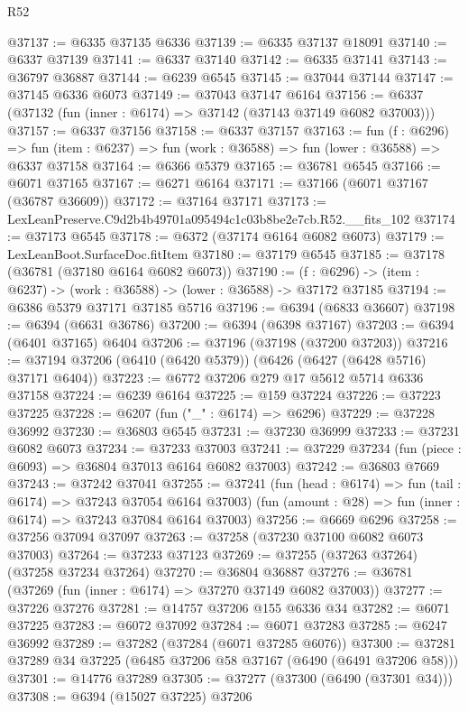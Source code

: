 \begin{lexlean}{R52}
\begin{coremodule}
@37137 := @6335 @37135 @6336
@37139 := @6335 @37137 @18091
@37140 := @6337 @37139
@37141 := @6337 @37140
@37142 := @6335 @37141
@37143 := @36797 @36887
@37144 := @6239 @6545
@37145 := @37044 @37144
@37147 := @37145 @6336 @6073
@37149 := @37043 @37147 @6164
@37156 := @6337 (@37132 (fun (inner : @6174) => @37142 (@37143 @37149 @6082 @37003)))
@37157 := @6337 @37156
@37158 := @6337 @37157
@37163 := fun (f : @6296) =>
  fun (item : @6237) => fun (work : @36588) => fun (lower : @36588) => @6337 @37158
@37164 := @6366 @5379
@37165 := @36781 @6545
@37166 := @6071 @37165
@37167 := @6271 @6164
@37171 := @37166 (@6071 @37167 (@36787 @36609))
@37172 := @37164 @37171
@37173 := LexLeanPreserve.C9d2b4b49701a095494c1c03b8be2e7cb.R52.__fits_102
@37174 := @37173 @6545
@37178 := @6372 (@37174 @6164 @6082 @6073)
@37179 := LexLeanBoot.SurfaceDoc.fitItem
@37180 := @37179 @6545
@37185 := @37178 (@36781 (@37180 @6164 @6082 @6073))
@37190 := (f : @6296) -> (item : @6237) -> (work : @36588) -> (lower : @36588) -> @37172 @37185
@37194 := @6386 @5379 @37171 @37185 @5716
@37196 := @6394 (@6833 @36607)
@37198 := @6394 (@6631 @36786)
@37200 := @6394 (@6398 @37167)
@37203 := @6394 (@6401 @37165) @6404
@37206 := @37196 (@37198 (@37200 @37203))
@37216 := @37194 @37206 (@6410 (@6420 @5379)) (@6426 (@6427 (@6428 @5716) @37171 @6404))
@37223 := @6772 @37206 @279 @17 @5612 @5714 @6336 @37158
@37224 := @6239 @6164
@37225 := @159 @37224
@37226 := @37223 @37225
@37228 := @6207 (fun ("_" : @6174) => @6296)
@37229 := @37228 @36992
@37230 := @36803 @6545
@37231 := @37230 @36999
@37233 := @37231 @6082 @6073
@37234 := @37233 @37003
@37241 := @37229 @37234 (fun (piece : @6093) => @36804 @37013 @6164 @6082 @37003)
@37242 := @36803 @7669
@37243 := @37242 @37041
@37255 := @37241
    (fun (head : @6174) => fun (tail : @6174) => @37243 @37054 @6164 @37003)
    (fun (amount : @28) => fun (inner : @6174) => @37243 @37084 @6164 @37003)
@37256 := @6669 @6296
@37258 := @37256 @37094 @37097
@37263 := @37258 (@37230 @37100 @6082 @6073 @37003)
@37264 := @37233 @37123
@37269 := @37255 (@37263 @37264) (@37258 @37234 @37264)
@37270 := @36804 @36887
@37276 := @36781 (@37269 (fun (inner : @6174) => @37270 @37149 @6082 @37003))
@37277 := @37226 @37276
@37281 := @14757 @37206 @155 @6336 @34
@37282 := @6071 @37225
@37283 := @6072 @37092
@37284 := @6071 @37283
@37285 := @6247 @36992
@37289 := @37282 (@37284 (@6071 @37285 @6076))
@37300 := @37281 @37289 @34 @37225 (@6485 @37206 @58 @37167 (@6490 (@6491 @37206 @58)))
@37301 := @14776 @37289
@37305 := @37277 (@37300 (@6490 (@37301 @34)))
@37308 := @6394 (@15027 @37225) @37206

\end{coremodule}
\end{lexlean}

